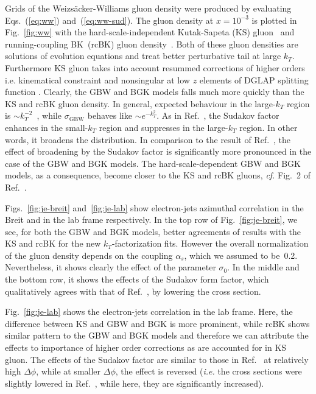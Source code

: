 \documentclass[11pt]{article}
\begin{document}
Grids of the Weizs\"acker-Williams gluon density were produced by evaluating
Eqs.~(\ref{eq:ww}) and~(\ref{eq:ww-sud}).  The gluon density at $x=10^{-3}$ is
plotted in Fig.~\ref{fig:ww} with the hard-scale-independent Kutak-Sapeta (KS)
gluon~\cite{Kutak:2012rf,vanHameren:2021sqc,Abdulov:2021ivr} and running-coupling BK~(rcBK)
gluon density~\cite{Balitsky:2006wa,Albacete:2010sy,Hentschinski:2022rsa}.
Both of these gluon densities are solutions of evolution equations and treat better perturbative tail at large $k_T$. Furthermore KS gluon takes into account resummed corrections of higher orders i.e. kinematical constraint and nonsingular at low $z$ elements of DGLAP  splitting function \cite{Kwiecinski:1997ee}.
Clearly, the GBW and BGK models falls much more quickly
than the KS and rcBK gluon density. In general, expected behaviour in the
large-$k_T$ region is $\sim k_T^{-2}$~\cite{Dominguez:2010xd,Dominguez:2011wm},
while $\sigma_{\mathrm{GBW}}$ behaves like $\sim e^{-k_T^2}$.  As in
Ref.~\cite{vanHameren:2021sqc}, the Sudakov factor enhances in the small-$k_T$
region and suppresses in the large-$k_T$ region. In other words, it broadens the
distribution. In comparison to the result of Ref.~\cite{vanHameren:2021sqc}, the
effect of broadening by the Sudakov factor is significantly more pronounced in
the case of the GBW and BGK models. The hard-scale-dependent GBW and BGK models,
as a consequence, become closer to the KS and rcBK gluons, \textit{cf.} Fig.~2
of Ref.~\cite{vanHameren:2021sqc}.

Figs.~\ref{fig:je-breit} and~\ref{fig:je-lab} show electron-jets azimuthal
correlation in the Breit and in the lab frame respectively.  In the top row of Fig.~\ref{fig:je-breit}, we see, for both the
GBW and BGK models, better agreements of results with the KS and rcBK for the
new $k_T$-factorization fits. However the overall normalization of the gluon
density depends on the coupling $\alpha_s$, which we assumed to be~0.2.
Nevertheless, it shows clearly the effect of the parameter $\sigma_0$. In the
middle and the bottom row, it shows the effects of the Sudakov form factor,
which qualitatively agrees with that of Ref.~\cite{vanHameren:2021sqc}, by
lowering the cross section.  

Fig.~\ref{fig:je-lab} shows the electron-jets
correlation in the lab frame. Here, the difference between KS and GBW and BGK
is more prominent, while rcBK shows similar pattern to the GBW and BGK models and therefore we can attribute the effects to importance of higher order corrections as are accounted for in KS gluon.
The effects of the Sudakov factor are similar to those
in Ref.~\cite{vanHameren:2021sqc} at relatively high $\Delta \phi$, while at
smaller $\Delta \phi$, the effect is reversed ({\it i.e.} the cross
sections were slightly lowered in Ref.~\cite{vanHameren:2021sqc}, while here,
they are significantly increased).
\end{document}
